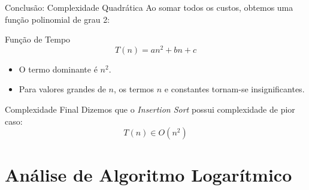 \documentclass[9pt]{beamer}
\begin{document}
\begin{frame}{Conclusão: Complexidade Quadrática}
    Ao somar todos os custos, obtemos uma função polinomial de grau 2:
    \vspace{0.4cm}
    \begin{block}{Função de Tempo}
        \[ T(n) = an^2 + bn + c \]
    \end{block}
    \vspace{0.4cm}
    \begin{itemize}
        \item O termo dominante é $n^2$.
        \item Para valores grandes de $n$, os termos $n$ e constantes tornam-se insignificantes.
    \end{itemize}
    \vspace{0.3cm}
    \begin{alertblock}{Complexidade Final}
        Dizemos que o \textit{Insertion Sort} possui complexidade de pior caso:
        \[ T(n) \in O(n^2) \]
    \end{alertblock}
\end{frame}

\section{Análise de Algoritmo Logarítmico}
\end{document}
